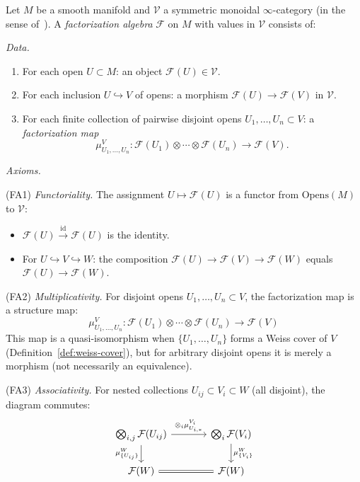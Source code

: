 \begin{definition}
\label{def:factorization-algebra-AF}
Let $M$ be a smooth manifold and $\mathcal{V}$ a symmetric monoidal $\infty$-category
(in the sense of~\cite[§2.0, §4.1]{HA}).
A \emph{factorization algebra} $\mathcal{F}$ on $M$ with values in $\mathcal{V}$
consists of:

\emph{Data.}
\begin{enumerate}
\item For each open $U \subset M$: an object $\mathcal{F}(U) \in \mathcal{V}$.

\item For each inclusion $U \hookrightarrow V$ of opens: a morphism
 $\mathcal{F}(U) \to \mathcal{F}(V)$ in $\mathcal{V}$.

\item For each finite collection of pairwise disjoint opens $U_1, \ldots, U_n \subset V$:
 a \emph{factorization map}
 \[\mu_{U_1,\ldots,U_n}^V: \mathcal{F}(U_1) \otimes \cdots \otimes \mathcal{F}(U_n)
 \to \mathcal{F}(V).\]
\end{enumerate}

\emph{Axioms.}

(FA1) \emph{Functoriality.} The assignment $U \mapsto \mathcal{F}(U)$ is a functor
from $\text{Opens}(M)$ to $\mathcal{V}$:
\begin{itemize}
\item $\mathcal{F}(U) \xrightarrow{\text{id}} \mathcal{F}(U)$ is the identity.
\item For $U \hookrightarrow V \hookrightarrow W$: the composition
 $\mathcal{F}(U) \to \mathcal{F}(V) \to \mathcal{F}(W)$ equals
 $\mathcal{F}(U) \to \mathcal{F}(W)$.
\end{itemize}

(FA2) \emph{Multiplicativity.} For disjoint opens $U_1, \ldots, U_n \subset V$,
the factorization map is a structure map:
\[\mu_{U_1,\ldots,U_n}^V: \mathcal{F}(U_1) \otimes \cdots \otimes \mathcal{F}(U_n)
 \longrightarrow \mathcal{F}(V)\]
This map is a quasi-isomorphism when $\{U_1, \ldots, U_n\}$ forms a
Weiss cover of $V$ (Definition~\ref{def:weiss-cover}), but for arbitrary disjoint opens it is merely a morphism (not necessarily an equivalence).

(FA3) \emph{Associativity.} For nested collections
$U_{ij} \subset V_i \subset W$ (all disjoint), the diagram commutes:
\[\begin{tikzcd}[column sep=large]
\bigotimes_{i,j} \mathcal{F}(U_{ij})
 \arrow[r, "{\otimes_i \mu_{U_{i,*}}^{V_i}}"]
 \arrow[d, "{\mu_{\{U_{ij}\}}^W}"'] &
\bigotimes_i \mathcal{F}(V_i)
 \arrow[d, "{\mu_{\{V_i\}}^W}"] \\
\mathcal{F}(W) \arrow[r, equal] & \mathcal{F}(W)
\end{tikzcd}\]


\end{definition}
